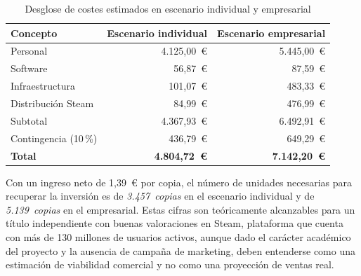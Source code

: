 \begin{table}[H]
	\centering
	\begin{tabular}{|l|r|r|}
		\hline
		\textbf{Concepto} &
		\textbf{Escenario individual} &
		\textbf{Escenario empresarial} \\
		\hline
		Personal            & 4.125,00~€ & 5.445,00~€ \\
		Software            & 56,87~€    & 87,59~€    \\
		Infraestructura     & 101,07~€   & 483,33~€   \\
		Distribución Steam  & 84,99~€    & 476,99~€   \\
		\hline
		Subtotal            & 4.367,93~€ & 6.492,91~€ \\
		Contingencia (10\,\%) & 436,79~€ & 649,29~€   \\
		\hline
		\textbf{Total}      & \textbf{4.804,72~€} & \textbf{7.142,20~€} \\
		\hline
	\end{tabular}
	\caption{Desglose de costes estimados en escenario individual y empresarial}
	\label{tab:costes}
\end{table}

Con un ingreso neto de 1,39~€ por copia, el número de unidades necesarias para recuperar la inversión es de \textit{3.457~copias} en el escenario individual y de \textit{5.139~copias} en el empresarial. Estas cifras son teóricamente alcanzables para un título independiente con buenas valoraciones en Steam, plataforma que cuenta con más de 130 millones de usuarios activos, aunque dado el carácter académico del proyecto y la ausencia de campaña de marketing, deben entenderse como una estimación de viabilidad comercial y no como una proyección de ventas real.